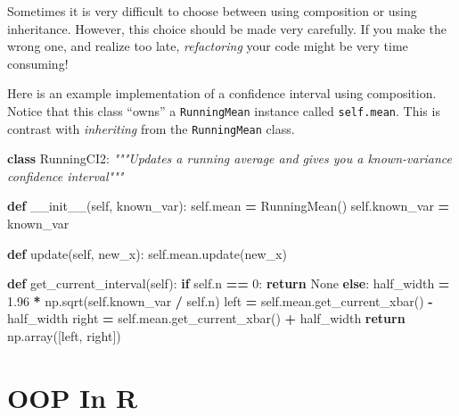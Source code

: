 \documentclass[
  12pt,
  krantz2]{krantz}
\makeatletter
\newenvironment{Shaded}{\begin{snugshade}}{\end{snugshade}}
\newcommand{\CommentTok}[1]{\textcolor[rgb]{0.37,0.37,0.37}{\textit{#1}}}
\newcommand{\ControlFlowTok}[1]{\textcolor[rgb]{0.27,0.27,0.27}{\textbf{#1}}}
\newcommand{\DecValTok}[1]{\textcolor[rgb]{0.06,0.06,0.06}{#1}}
\newcommand{\FloatTok}[1]{\textcolor[rgb]{0.06,0.06,0.06}{#1}}
\newcommand{\FunctionTok}[1]{\textcolor[rgb]{0,0,0}{#1}}
\newcommand{\KeywordTok}[1]{\textcolor[rgb]{0.27,0.27,0.27}{\textbf{#1}}}
\newcommand{\NormalTok}[1]{#1}
\newcommand{\OperatorTok}[1]{\textcolor[rgb]{0.43,0.43,0.43}{\textbf{#1}}}
\newcommand{\VariableTok}[1]{\textcolor[rgb]{0,0,0}{#1}}
\newenvironment{kframe}{%
\medskip{}
\setlength{\fboxsep}{.8em}
 \def\at@end@of@kframe{}%
 \ifinner\ifhmode%
  \def\at@end@of@kframe{\end{minipage}}%
  \begin{minipage}{\columnwidth}%
 \fi\fi%
 \def\FrameCommand##1{\hskip\@totalleftmargin \hskip-\fboxsep
 \colorbox{shadecolor}{##1}\hskip-\fboxsep
     \hskip-\linewidth \hskip-\@totalleftmargin \hskip\columnwidth}%
 \MakeFramed {\advance\hsize-\width
   \@totalleftmargin\z@ \linewidth\hsize
   \@setminipage}}%
 {\par\unskip\endMakeFramed%
 \at@end@of@kframe}
\renewenvironment{Shaded}{\begin{kframe}}{\end{kframe}}
\makeatother
\begin{document}
\begin{rmd-caution}
Sometimes it is very difficult to choose between using composition or using inheritance. However, this choice should be made very carefully. If you make the wrong one, and realize too late, \emph{refactoring} your code might be very time consuming!

\end{rmd-caution}

Here is an example implementation of a confidence interval using composition. Notice that this class ``owns'' a \texttt{RunningMean} instance called \texttt{self.mean}. This is contrast with \emph{inheriting} from the \texttt{RunningMean} class.

\begin{Shaded}
\begin{Highlighting}[]
\KeywordTok{class}\NormalTok{ RunningCI2:}
    \CommentTok{"""Updates a running average and }
\CommentTok{    gives you a known{-}variance confidence interval"""}
    
    \KeywordTok{def} \FunctionTok{\_\_init\_\_}\NormalTok{(}\VariableTok{self}\NormalTok{, known\_var):}
        \VariableTok{self}\NormalTok{.mean }\OperatorTok{=}\NormalTok{ RunningMean()}
        \VariableTok{self}\NormalTok{.known\_var }\OperatorTok{=}\NormalTok{ known\_var}
        
    \KeywordTok{def}\NormalTok{ update(}\VariableTok{self}\NormalTok{, new\_x):    }
        \VariableTok{self}\NormalTok{.mean.update(new\_x)}
        
    \KeywordTok{def}\NormalTok{ get\_current\_interval(}\VariableTok{self}\NormalTok{):}
        \ControlFlowTok{if} \VariableTok{self}\NormalTok{.n }\OperatorTok{==} \DecValTok{0}\NormalTok{:}
            \ControlFlowTok{return} \VariableTok{None}
        \ControlFlowTok{else}\NormalTok{:}
\NormalTok{            half\_width }\OperatorTok{=} \FloatTok{1.96} \OperatorTok{*}\NormalTok{ np.sqrt(}\VariableTok{self}\NormalTok{.known\_var }\OperatorTok{/} \VariableTok{self}\NormalTok{.n)  }
\NormalTok{            left }\OperatorTok{=} \VariableTok{self}\NormalTok{.mean.get\_current\_xbar() }\OperatorTok{{-}}\NormalTok{ half\_width}
\NormalTok{            right }\OperatorTok{=} \VariableTok{self}\NormalTok{.mean.get\_current\_xbar() }\OperatorTok{+}\NormalTok{ half\_width}
            \ControlFlowTok{return}\NormalTok{ np.array([left, right])}
\end{Highlighting}
\end{Shaded}

\hypertarget{oop-in-r}{%
\section{OOP In R}\label{oop-in-r}}
\end{document}
